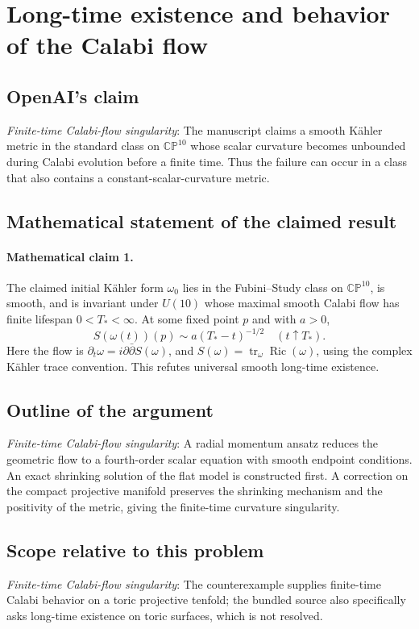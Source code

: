 \documentclass[11pt]{article}
\begin{document}
\section*{Long-time existence and behavior of the Calabi flow}

\subsection{OpenAI's claim}
\textit{Finite-time Calabi-flow singularity}: The manuscript claims a smooth Kähler metric in the standard class on $\mathbb {CP}^{10}$ whose scalar curvature becomes unbounded during Calabi evolution before a finite time. Thus the failure can occur in a class that also contains a constant-scalar-curvature metric.

\subsection{Mathematical statement of the claimed result}
\paragraph{Mathematical claim 1.} The claimed initial K\"ahler form $\omega_0$ lies in the Fubini--Study class on $\mathbb{CP}^{10}$, is smooth, and is invariant under $U(10)$ whose maximal smooth Calabi flow has finite lifespan $0<T_*<\infty$. At some fixed point $p$ and with $a>0$, \[S(\omega(t))(p)\sim a(T_*-t)^{-1/2}\quad(t\uparrow T_*).\] Here the flow is $\partial_t\omega=i\partial\bar\partial S(\omega)$, and $S(\omega)=\operatorname{tr}_{\omega}\operatorname{Ric}(\omega)$, using the complex K\"ahler trace convention. This refutes universal smooth long-time existence.

\subsection{Outline of the argument}
\textit{Finite-time Calabi-flow singularity}: A radial momentum ansatz reduces the geometric flow to a fourth-order scalar equation with smooth endpoint conditions. An exact shrinking solution of the flat model is constructed first. A correction on the compact projective manifold preserves the shrinking mechanism and the positivity of the metric, giving the finite-time curvature singularity.

\subsection{Scope relative to this problem}
\textit{Finite-time Calabi-flow singularity}: The counterexample supplies finite-time Calabi behavior on a toric projective tenfold; the bundled source also specifically asks long-time existence on toric surfaces, which is not resolved.
\end{document}

